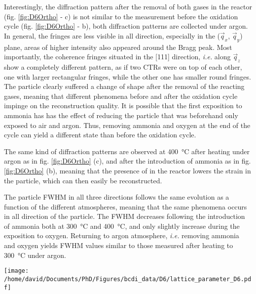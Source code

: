 Interestingly, the diffraction pattern after the removal of both gases in the reactor (fig. \ref{fig:D6Ortho} - c) is not similar to the measurement before the oxidation cycle (fig. \ref{fig:D6Ortho} - b), both diffraction patterns are collected under argon.
In general, the fringes are less visible in all direction, especially in the ($\vec{q}_x$, $\vec{q}_y$) plane, areas of higher intensity also appeared around the Bragg peak.
Most importantly, the coherence fringes situated in the [111] direction, \textit{i.e.} along $\vec{q}_z$ show a completely different pattern, as if two CTRs were on top of each other, one with larger rectangular fringes, while the other one has smaller round fringes.
The particle clearly suffered a change of shape after the removal of the reacting gases, meaning that different phenomena before and after the oxidation cycle impinge on the reconstruction quality.
It is possible that the first exposition to ammonia has has the effect of reducing the particle that was beforehand only exposed to air and argon.
Thus, removing ammonia and oxygen at the end of the cycle can yield a different state than before the oxidation cycle.

The same kind of diffraction patterns are observed at \qty{400}{\degreeCelsius} after heating under argon as in fig. \ref{fig:D6Ortho} (c), and after the introduction of ammonia as in fig. \ref{fig:D6Ortho} (b), meaning that the presence of  in the reactor lowers the strain in the particle, which can then easily be reconstructed.

The particle FWHM in all three directions follows the same evolution as a function of the different atmospheres, meaning that the same phenomena occurs in all direction of the particle.
The FWHM decreases following the introduction of ammonia both at \qty{300}{\degreeCelsius} and \qty{400}{\degreeCelsius}, and only slightly increase during the exposition to oxygen.
Returning to argon atmosphere, \textit{i.e.} removing ammonia and oxygen yields FWHM values similar to those measured after heating to \qty{300}{\degreeCelsius} under argon.

\begin{SCfigure}
    \centering
    \texttt{[image: /home/david/Documents/PhD/Figures/bcdi\_data/D6/lattice\_parameter\_D6.pdf]}
    \caption{
        Evolution of the interplanar spacing $d_{111}$ and homogeneous strain $\epsilon_{111}$ for particle C as a function of the ammonia to oxygen ratio.
        The reference for the computation of $\epsilon_{111}$ was taken at \qty{25}{\degreeCelsius}.
        The reproduction of measurements at fixed conditions yield multiple data points, lines at \qty{300}{\degreeCelsius} and \qty{400}{\degreeCelsius} link the data points in the order of the measurements.
        No scans were performed at \qty{400}{\degreeCelsius} under Argon after the oxidation cycle.
    }
    \label{fig:D6Latpara}
\end{SCfigure}

